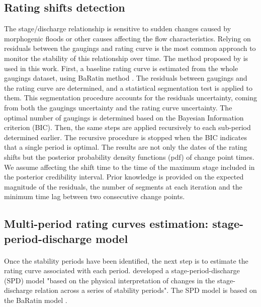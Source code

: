 \documentclass[11pt]{article}
\begin{document}
    



     \subsection{Rating shifts detection}
    
    The stage/discharge relationship is sensitive to sudden changes caused by morphogenic floods or other causes affecting the flow characteristics. Relying on residuals between the gaugings and rating curve is the most common approach to monitor the stability of this relationship over time. The method proposed by \citet{darienzo_detection_2021} is used in this work. First, a baseline rating curve is estimated from the whole gaugings dataset, using BaRatin method \citep{le_coz_combining_2014}. The residuals between gaugings and the rating curve are determined, and a statistical segmentation test is applied to them. This segmentation procedure accounts for the residuals uncertainty, coming from both the gaugings uncertainty and the rating curve uncertainty. The optimal number of gaugings is determined based on the Bayesian Information criterion (BIC). Then, the same steps are applied recursively to each sub-period determined earlier. The recursive procedure is stopped when the BIC indicates that a single period is optimal. The results are not only the dates of the rating shifts but the posterior probability density functions (pdf) of change point times. We assume affecting the shift time to the time of the maximum stage included in the posterior credibility interval. Prior knowledge is provided on the expected magnitude of the residuals, the number of segments at each iteration and the minimum time lag between two consecutive change points.
    
    \subsection{Multi-period rating curves estimation: stage-period-discharge model}

    \paragraph{}
    Once the stability periods have been identified, the next step is to estimate the rating curve associated with each period. \citet{mansanarez_shift_2019} developed a stage-period-discharge (SPD) model "based on the physical interpretation of changes in the stage-discharge relation across a series of stability periods". The SPD model is based on the BaRatin model \citep{le_coz_combining_2014}.
\end{document}
